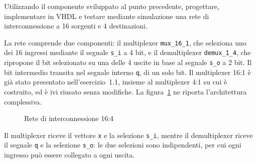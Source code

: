 \label{sec:esercizio1-2}

\begin{traccia}
Utilizzando il componente sviluppato al punto precedente, progettare, implementare in VHDL e testare mediante simulazione una rete di interconnessione a 16 sorgenti e 4 destinazioni.
\end{traccia}

\progetto

La rete comprende due componenti: il multiplexer \texttt{mux\_16\_1}, che seleziona uno dei 16 ingressi mediante il segnale \texttt{s\_i} a 4 bit, e il demultiplexer \texttt{demux\_1\_4}, che ripropone il bit selezionato su una delle 4 uscite in base al segnale \texttt{s\_o} a 2 bit. Il bit intermedio transita nel segnale interno \texttt{q}, di un solo bit. Il multiplexer 16:1 è già stato presentato nell'esercizio~1.1, insieme al multiplexer 4:1 su cui è costruito, ed è ivi riusato senza modifiche. La figura~\ref{fig:esercizio1-2:schema} ne riporta l'architettura complessiva.

\begin{figure}[H]
  \centering
  \caption{Rete di interconnessione 16:4}
  \label{fig:esercizio1-2:schema}
\end{figure}

Il multiplexer riceve il vettore \texttt{x} e la selezione \texttt{s\_i}, mentre il demultiplexer riceve il segnale \texttt{q} e la selezione \texttt{s\_o}: le due selezioni sono indipendenti, per cui ogni ingresso può essere collegato a ogni uscita.

